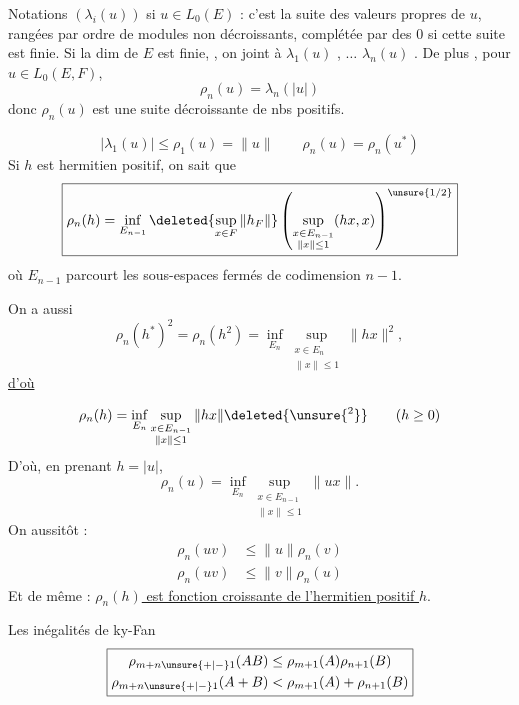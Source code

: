 
Notations $(\lambda_i(u))$ si $u\in L_0(E)$ : c'est la suite des valeurs  propres de $u$, rangées par ordre de modules non décroissants, complétée par des $0$ si cette suite est finie.
Si la dim de $E$ est finie, ,  on joint  à $\lambda_1(u)$ , $\ldots$ $\lambda_n(u)$  .
De plus , pour $u\in L_0(E,F)$,
\[
\boxed{\rho_n(u)=\lambda_n(|u|)}
\]
donc $\rho_n(u)$ est une suite décroissante de nbs positifs.

\qquad{}
\[
\boxed{|\lambda_1(u)|\leq\rho_1(u)=\|u\|}\qquad
\boxed{\rho_n(u)=\rho_n(u^*)}
\]
Si $h$ est hermitien positif, on sait que
\[
\boxed{\rho_n(h)=\inf_{E_{n-1}}\deleted{\sup_{x\in F}\|h_F\|}\left(\sup_{\substack{x\in E_{n-1}\\\|x\|\leq1}}(hx,x)\right)^{\unsure{1/2}}}
\]
où  $E_{n-1}$ parcourt  les sous-espaces  fermés de codimension $n-1$.

On a aussi
\[
\rho_n(h^{*})^2=\rho_n(h^2)=\inf_{E_n}\sup_{\substack{x\in E_n\\\|x\|\leq1}}\|hx\|^2,
\]
\uline{d'où}

\[
\rho_n(h)=\inf_{E_n}\sup_{\substack{x\in E_{n-1}\\\|x\|\leq1}}\|hx\|\deleted{\unsure{{}^2}}\qquad(h\geq0)
\]
D'où, en prenant $h=|u|$,
\[
\boxed{\rho_n(u)=\inf_{E_n}\sup_{\substack{x\in E_{n-1}\\\|x\|\leq1}}\|ux\|}.
\]
On   aussitôt :
\[
\boxed{\begin{aligned}
\rho_n(uv)&\leq\|u\|\rho_n(v)\\
\rho_n(uv)&\leq\|v\|\rho_n(u)
\end{aligned}}
\]
Et de même : \uline{$\rho_n(h)$ est fonction croissante de l'hermitien positif $h$}.

Les inégalités de ky-Fan
\[
\boxed{\begin{aligned}
\rho_{m+n\unsure{+|-}1}(AB)&\leq\rho_{m+1}(A)\rho_{n+1}(B)\\
\rho_{m+n\unsure{+|-}1}(A+B)&<\rho_{m+1}(A)+\rho_{n+1}(B)
\end{aligned}}
\]

